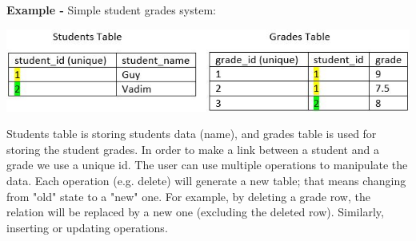 \documentclass[oneside]{book}
\begin{document}
\textbf{Example -} Simple student grades system:

\begin{center}
\includegraphics[scale=0.9]{table1}
\end{center}

Students table is storing students data (name), and grades table is used for storing the student grades. In order to make a link between a student and a grade we use a unique id. The user can use multiple operations to manipulate the data. Each operation (e.g. delete) will generate a new table; that means changing from "old" state to a "new" one. For example, by deleting a grade row, the relation will be replaced by a new one (excluding the deleted row). Similarly, inserting or updating operations.\\
\end{document}
